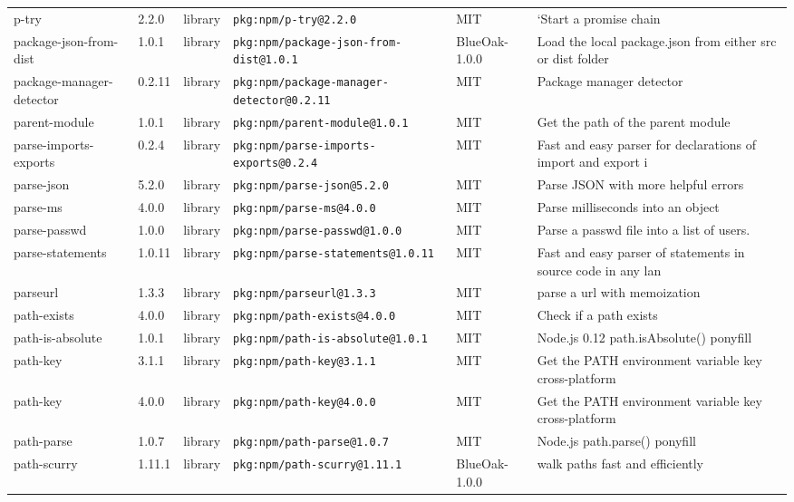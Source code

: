 \documentclass[11pt]{article}
\begin{document}
\begin{longtable}{|l|l|l|p{2.2cm}|l|p{4cm}|}
p-try & 2.2.0 & library & \texttt{pkg:npm/p-try@2.2.0} & MIT & `Start a promise chain \\
package-json-from-dist & 1.0.1 & library & \texttt{pkg:npm/package-json-from-dist@1.0.1} & BlueOak-1.0.0 & Load the local package.json from either src or dist folder \\
package-manager-detector & 0.2.11 & library & \texttt{pkg:npm/package-manager-detector@0.2.11} & MIT & Package manager detector \\
parent-module & 1.0.1 & library & \texttt{pkg:npm/parent-module@1.0.1} & MIT & Get the path of the parent module \\
parse-imports-exports & 0.2.4 & library & \texttt{pkg:npm/parse-imports-exports@0.2.4} & MIT & Fast and easy parser for declarations of import and export i \\
parse-json & 5.2.0 & library & \texttt{pkg:npm/parse-json@5.2.0} & MIT & Parse JSON with more helpful errors \\
parse-ms & 4.0.0 & library & \texttt{pkg:npm/parse-ms@4.0.0} & MIT & Parse milliseconds into an object \\
parse-passwd & 1.0.0 & library & \texttt{pkg:npm/parse-passwd@1.0.0} & MIT & Parse a passwd file into a list of users. \\
parse-statements & 1.0.11 & library & \texttt{pkg:npm/parse-statements@1.0.11} & MIT & Fast and easy parser of statements in source code in any lan \\
parseurl & 1.3.3 & library & \texttt{pkg:npm/parseurl@1.3.3} & MIT & parse a url with memoization \\
path-exists & 4.0.0 & library & \texttt{pkg:npm/path-exists@4.0.0} & MIT & Check if a path exists \\
path-is-absolute & 1.0.1 & library & \texttt{pkg:npm/path-is-absolute@1.0.1} & MIT & Node.js 0.12 path.isAbsolute() ponyfill \\
path-key & 3.1.1 & library & \texttt{pkg:npm/path-key@3.1.1} & MIT & Get the PATH environment variable key cross-platform \\
path-key & 4.0.0 & library & \texttt{pkg:npm/path-key@4.0.0} & MIT & Get the PATH environment variable key cross-platform \\
path-parse & 1.0.7 & library & \texttt{pkg:npm/path-parse@1.0.7} & MIT & Node.js path.parse() ponyfill \\
path-scurry & 1.11.1 & library & \texttt{pkg:npm/path-scurry@1.11.1} & BlueOak-1.0.0 & walk paths fast and efficiently \\

\end{longtable}
\end{document}
